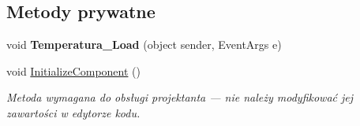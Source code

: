 \subsection*{Metody prywatne}
\begin{DoxyCompactItemize}
\item 
\mbox{\label{classkalku__all__in__one_1_1_temperatura_a6cc4c7690a51598cd0aabe468acea115}} 
void {\bfseries Temperatura\+\_\+\+Load} (object sender, Event\+Args e)
\item 
void \mbox{\hyperlink{classkalku__all__in__one_1_1_temperatura_ada295f106cae3110fbbd17ca1bb6506a}{Initialize\+Component}} ()
\begin{DoxyCompactList}\small\item\em Metoda wymagana do obsługi projektanta — nie należy modyfikować jej zawartości w edytorze kodu. \end{DoxyCompactList}\end{DoxyCompactItemize}
